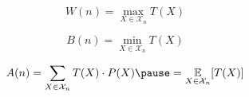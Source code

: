 
\begin{frame}{}
\end{frame}

\begin{frame}{}
  \begin{center}
    {\large {}} \\[8pt] \pause
    {\large {}}
  \end{center}

  \pause
  \[
    W(n) = \max_{X \in \mathcal{X}_{n}} T(X)
  \]

  \pause
  \[
    B(n) = \min_{X \in \mathcal{X}_{n}} T(X)
  \]

  \pause
  \[
    A(n) = \sum_{X \in \mathcal{X}_{n}} T(X) \cdot P(X) \pause = \underset{X \in \mathcal{X}_{n}}{\mathbb{E}} [T(X)]
  \]
\end{frame}

